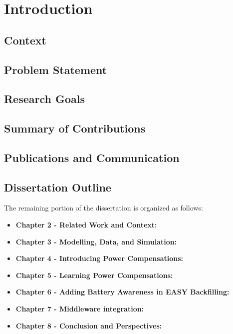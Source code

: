 \chapter{Introduction}
\label{chap1}

\section{Context}

\section{Problem Statement}

\section{Research Goals}

\section{Summary of Contributions}

\section{Publications and Communication}

\section{Dissertation Outline}
The remaining portion of the dissertation is organized as follows:
\begin{itemize}
    \item[] \textbf{Chapter 2 - Related Work and Context:} 
    \item[] \textbf{Chapter 3 - Modelling, Data, and Simulation:} 
    \item[] \textbf{Chapter 4 - Introducing Power Compensations:} 
    \item[] \textbf{Chapter 5 - Learning Power Compensations:} 
    \item[] \textbf{Chapter 6 - Adding Battery Awareness in EASY Backfilling:} 
    \item[] \textbf{Chapter 7 - Middleware integration:} 
    \item[] \textbf{Chapter 8 - Conclusion and Perspectives:} 
\end{itemize}
